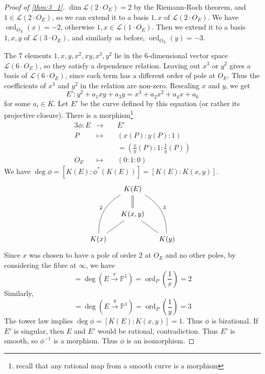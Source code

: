 \documentclass[11pt]{article}
\theoremstyle{definition}
\theoremstyle{plain}
\theoremstyle{remark}
\DeclareMathOperator{\ord}{ord}
\newcommand{\PP}{\mathbb{P}}
\newcommand{\cL}{\mathcal{L}}
\begin{document}
\begin{proof}[Proof of \autoref{thm:3_1}]
    $\dim \cL(2 \cdot O_E) = 2$ by the Riemann-Roch theorem, and $1 \in \cL(2 \cdot O_E)$, so we can extend it to a basis $1, x$ of $\cL(2 \cdot O_E)$. We have $\ord_{O_E}(x) = -2$, otherwise $1, x \in \cL(1 \cdot O_E)$. Then we extend it to a basis $1,x,y$ of $\cL(3 \cdot O_E)$, and similarly as before, $\ord_{O_E}(y) = -3$.

    The $7$ elements $1,x,y,x^2,xy,x^3,y^2$ lie in the $6$-dimensional vector space $\cL(6 \cdot O_E)$, so they satisfy a dependence relation. Leaving out $x^3$ or $y^2$ gives a basis of $\cL(6 \cdot O_E)$, since each term has a different order of pole at $O_E$. Thus the coefficients of $x^3$ and $y^2$ in the relation are non-zero. Rescaling $x$ and $y$, we get
    \begin{equation*}
        E' : y^2 + a_1xy + a_3 y = x^3 + a_2x^2 + a_4x + a_6
    \end{equation*}
    for some $a_i \in K$. Let $E'$ be the curve defined by this equation (or rather its projective closure). There is a morphism\footnote{recall that any rational map from a smooth curve is a morphism}
    \begin{alignat*}{3}
        \phi : E &\longrightarrow\,\,&& E'\\
        P &\longmapsto&& (x(P) : y(P) : 1)\\
        & &&= \left(\frac{x}{y}(P) : 1 : \frac{1}{y}(P)\right)\\
        O_E &\longmapsto&& (0 : 1 : 0)
    \end{alignat*}
    We have $\deg \phi = [K(E) : \phi^*(K(E))] = [K(E) : K(x,y)]$.
    \begin{equation*}
        \begin{tikzcd}[column sep=small]
        & K(E) \arrow[d, equal] \arrow[ddl, dash, bend right, "2"'] \arrow[ddr, dash, bend left, "3"] &\\
        & K(x,y) \arrow[dl, dash] \arrow[dr, dash] &\\
        K(x) & & K(y)
    \end{tikzcd}
    \end{equation*}
    Since $x$ was chosen to have a pole of order $2$ at $O_E$ and no other poles, by considering the fibre at $\infty$, we have
    \begin{equation*}
        [K(E) : K(x)] = \deg(E \xrightarrow{x} \PP^1) = \ord_P\left(\frac{1}{x}\right) = 2
    \end{equation*}
    Similarly,
    \begin{equation*}
        [K(E) : K(y)] = \deg(E \xrightarrow{y} \PP^1) = \ord_P\left(\frac{1}{y}\right) = 3
    \end{equation*}
    The tower law implies $\deg \phi = [K(E) : K(x,y)] = 1$. Thus $\phi$ is birational. If $E'$ is singular, then $E$ and $E'$ would be rational, contradiction. Thus $E'$ is smooth, so $\phi^{-1}$ is a morphism. Thus $\phi$ is an isomorphism.
\end{proof}
\end{document}
